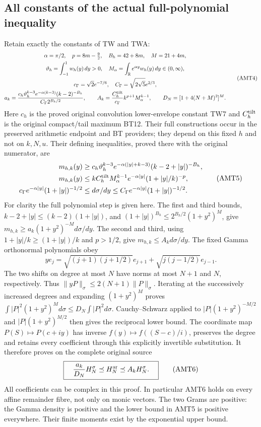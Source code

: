 \documentclass[11pt,a4paper]{article}
\begin{document}
\subsection{All constants of the actual full-polynomial inequality}
Retain exactly the constants of TW and TWA:
\[
\begin{gathered}
 \alpha=\pi/2,\quad p=8m-\tfrac92,\quad B_h=42+8m,\quad M=21+4m,\\
 \vartheta_h=\int_{-1}^1w_h(y)\,dy>0,\quad
 M_\alpha=\int_{\mathbb R}e^{\alpha y}w_h(y)\,dy\in(0,\infty),\\
 c_\Gamma=\sqrt2e^{-7/6},\quad C_\Gamma=\sqrt{2\sqrt5}e^{2/3},\\
 a_k=\frac{c_h\vartheta_h^{k-3}e^{-\alpha(k-3)}(k-2)^{-B_h}}
                   {C_\Gamma2^{B_h/2}},\qquad
 A_k=\frac{C_h^{\rm tilt}}{c_\Gamma}k^{p+1}M_\alpha^{k-1},\qquad
 D_N=[1+4(N+M)^2]^M.
\end{gathered}\tag{AMT4}
\]
Here $c_h$ is the proved original convolution lower-envelope constant
TW7 and $C_h^{\rm tilt}$ is the original compact/tail maximum BT12.
Their full constructions occur in the preserved arithmetic endpoint
and BT providers; they depend on this fixed $h$ and not on $k,N,u$.
Their defining inequalities, proved there with the original numerator,
are
\[
\begin{aligned}
 m_{h,k}(y)&\ge c_h\vartheta_h^{k-3}
    e^{-\alpha(|y|+k-3)}(k-2+|y|)^{-B_h},\\
 m_{h,k}(y)&\le k C_h^{\rm tilt}M_\alpha^{k-1}
              e^{-\alpha|y|}(1+|y|/k)^{-p},\\
 c_\Gamma e^{-\alpha|y|}(1+|y|)^{-1/2}
 &\le d\sigma/dy\le
 C_\Gamma e^{-\alpha|y|}(1+|y|)^{-1/2}.
\end{aligned}\tag{AMT5}
\]
For clarity the full polynomial step is given here. The first and
third bounds, $k-2+|y|\le(k-2)(1+|y|)$, and
$(1+|y|)^{B_h}\le2^{B_h/2}(1+y^2)^M$, give
$m_{h,k}\ge a_k(1+y^2)^{-M}d\sigma/dy$. The second and third,
using $1+|y|/k\ge(1+|y|)/k$ and $p>1/2$, give
$m_{h,k}\le A_kd\sigma/dy$.
The fixed Gamma orthonormal polynomials obey
\[
 ye_j=\sqrt{(j+1)(j+1/2)}e_{j+1}
                         +\sqrt{j(j-1/2)}e_{j-1}.
\]
The two shifts on degree at most $N$ have norms at most $N+1$ and
$N$, respectively. Thus $\|yP\|_\sigma\le2(N+1)\|P\|_\sigma$.
Iterating at the successively increased degrees and expanding
$(1+y^2)^M$ proves
$\int|P|^2(1+y^2)^M d\sigma\le D_N\int|P|^2d\sigma$.
Cauchy--Schwarz applied to $|P|(1+y^2)^{-M/2}$ and
$|P|(1+y^2)^{M/2}$ then gives the reciprocal lower bound. The
coordinate map $P(S)\mapsto P(c+iy)$ has inverse
$f(y)\mapsto f((S-c)/i)$, preserves the degree and retains every
coefficient through this explicitly invertible substitution. It
therefore proves on the complete original source
\[
 \boxed{\quad \frac{a_k}{D_N}H_N^\sigma
                  \preceq H_N^{\rm ar}\preceq A_kH_N^\sigma.\quad}
 \tag{AMT6}
\]
All coefficients can be complex in this proof. In particular AMT6
holds on every affine remainder fibre, not only on monic vectors.
The two Grams are positive: the Gamma density is positive and the
lower bound in AMT5 is positive everywhere. Their finite moments
exist by the exponential upper bound.
\end{document}
